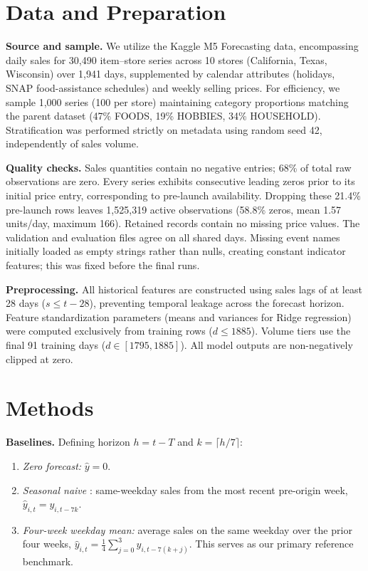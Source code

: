 \documentclass{article}
\begin{document}
\section{Data and Preparation}
\textbf{Source and sample.} We utilize the Kaggle M5 Forecasting data, encompassing daily sales for 30,490 item--store series across 10 stores (California, Texas, Wisconsin) over 1,941 days, supplemented by calendar attributes (holidays, SNAP food-assistance schedules) and weekly selling prices. For efficiency, we sample 1,000 series (100 per store) maintaining category proportions matching the parent dataset (47\% FOODS, 19\% HOBBIES, 34\% HOUSEHOLD). Stratification was performed strictly on metadata using random seed 42, independently of sales volume.

\textbf{Quality checks.} Sales quantities contain no negative entries; 68\% of total raw observations are zero. Every series exhibits consecutive leading zeros prior to its initial price entry, corresponding to pre-launch availability. Dropping these 21.4\% pre-launch rows leaves 1,525,319 active observations (58.8\% zeros, mean 1.57 units/day, maximum 166). Retained records contain no missing price values. The validation and evaluation files agree on all shared days. Missing event names initially loaded as empty strings rather than nulls, creating constant indicator features; this was fixed before the final runs.

\textbf{Preprocessing.} All historical features are constructed using sales lags of at least 28 days ($s \le t-28$), preventing temporal leakage across the forecast horizon. Feature standardization parameters (means and variances for Ridge regression) were computed exclusively from training rows ($d \le 1885$). Volume tiers use the final 91 training days ($d\in[1795,1885]$). All model outputs are non-negatively clipped at zero.

\section{Methods}
\textbf{Baselines.} Defining horizon $h=t-T$ and $k=\lceil h/7\rceil$:
\begin{enumerate}\setlength{\itemsep}{0pt}\setlength{\parsep}{0pt}
\item \emph{Zero forecast:} $\hat y=0$.
\item \emph{Seasonal naive} \citep{hyndman2021}: same-weekday sales from the most recent pre-origin week, $\hat y_{i,t}=y_{i,t-7k}$.
\item \emph{Four-week weekday mean:} average sales on the same weekday over the prior four weeks, $\hat y_{i,t}=\frac14\sum_{j=0}^{3}y_{i,t-7(k+j)}$. This serves as our primary reference benchmark.
\end{enumerate}
\end{document}
